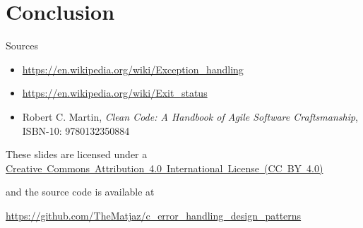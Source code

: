\documentclass[aspectratio=169,14pt]{beamer}
\begin{document}
\section{Conclusion}

\begin{frame}{Sources}
    \begin{itemize}
        \item \url{https://en.wikipedia.org/wiki/Exception_handling}
        \item \url{https://en.wikipedia.org/wiki/Exit_status}
        \item Robert C. Martin, \textit{Clean Code: A Handbook of Agile Software Craftsmanship}, ISBN-10: 9780132350884 
    \end{itemize}
    
    \begin{footnotesize}
        \begin{center}
            These slides are licensed under a \href{https://creativecommons.org/licenses/by/4.0/}{Creative~Commons~Attribution~4.0~International~License~(CC~BY~4.0)}
            
            and the source code is available at
            
            \url{https://github.com/TheMatjaz/c_error_handling_design_patterns}
        \end{center}    
    \end{footnotesize}
\end{frame}
\end{document}
